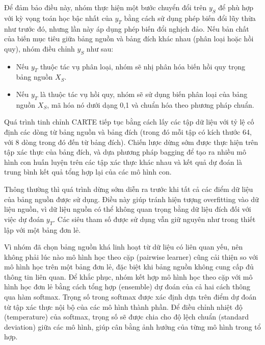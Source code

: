\documentclass{article}
\begin{document}
Để đảm bảo điều này, nhóm thực hiện một bước chuyển đổi trên $y_S$ để phù hợp với kỳ vọng toán học bậc nhất của $y_T$ bằng cách sử dụng phép biến đổi lũy thừa như trước đó, nhưng lần này áp dụng phép biến đổi nghịch đảo. Nếu bản chất của biến mục tiêu giữa bảng nguồn và bảng đích khác nhau (phân loại hoặc hồi quy), nhóm điều chỉnh $y_S$ như sau:

\begin{itemize}
    \item Nếu $y_T$ thuộc tác vụ phân loại, nhóm sẽ nhị phân hóa biến hồi quy trọng bảng nguồn $X_S$.
    \item Nếu $y_T$ là thuộc tác vụ hồi quy, nhóm sẽ sử dụng biến phân loại của bảng nguồn $X_S$, mã hóa nó dưới dạng {0,1} và chuẩn hóa theo phương pháp chuẩn.
\end{itemize}

Quá trình tinh chỉnh CARTE tiếp tục bằng cách lấy các tập dữ liệu với tỷ lệ cố định các dòng từ bảng nguồn và bảng đích (trong đó mỗi tập có kích thước 64, với 8 dòng trong đó đến từ bảng đích). Chiến lược dừng sớm được thực hiện trên tập xác thực của bảng đích, và dựa phương pháp bagging để tạo ra nhiều mô hình con huấn luyện trên các tập xác thực khác nhau và kết quả dự đoán là trung bình kết quả tổng hợp lại của các mô hình con.

Thông thường thì quá trình dừng sớm diễn ra trước khi tất cả các điểm dữ liệu của bảng nguồn được sử dụng. Điều này giúp tránh hiện tượng overfitting vào dữ liệu nguồn, vì dữ liệu nguồn có thể không quan trọng bằng dữ liệu đích đối với việc dự đoán $y_T$. Các siêu tham số được sử dụng vẫn giữ nguyên như trong thiết lập với một bảng đơn lẻ.

Vì nhóm đã chọn bảng nguồn khá linh hoạt từ dữ liệu có liên quan yếu, nên không phải lúc nào mô hình học theo cặp (pairwise learner) cũng cải thiện so với mô hình học trên một bảng đơn lẻ, đặc biệt khi bảng nguồn không cung cấp đủ thông tin liên quan. Để khắc phục, nhóm kết hợp mô hình học theo cặp với mô hình học đơn lẻ bằng cách tổng hợp (ensemble) dự đoán của cả hai cách thông qua hàm softmax. Trọng số trong softmax được xác định dựa trên điểm dự đoán từ tập xác thực nội bộ của các mô hình thành phần. Để điều chỉnh nhiệt độ (temperature) của softmax, trọng số sẽ được chia cho độ lệch chuẩn (standard deviation) giữa các mô hình, giúp cân bằng ảnh hưởng của từng mô hình trong tổ hợp.
\end{document}
